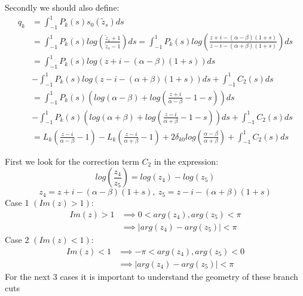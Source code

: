 \documentclass{article}
\begin{document}
Secondly we should also define:
\begin{align}
    q_k&=\int_{-1}^1P_k(s)s_0(\tilde{z}_s)ds\\
    &=\int_{-1}^1P_k(s)log(\frac{\tilde{z}_s+1}{\tilde{z}_s-1})ds
    =\int_{-1}^1P_k(s)log(\frac{z+i-(\alpha-\beta)(1+s)}{z-i-(\alpha+\beta)(1+s)})ds\\
    &=\int_{-1}^1P_k(s)log(z+i-(\alpha-\beta)(1+s))ds\\
    &-\int_{-1}^1P_k(s)log(z-i-(\alpha+\beta)(1+s))ds+\int_{-1}^1C_2(s)ds\\
    &=\int_{-1}^1P_k(s)(log(\alpha-\beta)+log(\frac{z+i}{\alpha-\beta}-1-s))ds\\
    &-\int_{-1}^1P_k(s)(log(\alpha+\beta)+log(\frac{z-i}{\alpha+\beta}-1-s))ds+\int_{-1}^1C_2(s)ds\\
    &=L_k(\frac{z-i}{\alpha-\beta}-1)-L_k(\frac{z-i}{\alpha+\beta}-1)
    +2\delta_{k0}log(\frac{\alpha-\beta}{\alpha+\beta})+\int_{-1}^1C_2(s)ds
\end{align}

First we look for the correction term $C_2$ in the expression:
$$log(\frac{z_4}{z_5})=log(z_4)-log(z_5)$$
$$z_4=z+i-(\alpha-\beta)(1+s),\:z_5=z-i-(\alpha+\beta)(1+s)$$
Case 1 $(Im(z)>1)$:
\begin{align}
    Im(z)>1 &\implies 0<arg(z_4),arg(z_5)<\pi\\
    &\implies |arg(z_4)-arg(z_5)|<\pi
\end{align}
Case 2 $(Im(z)<1)$:
\begin{align}
    Im(z)<1 &\implies -\pi<arg(z_4),arg(z_5)<0\\
    &\implies |arg(z_4)-arg(z_5)|<\pi
\end{align}
For the next 3 cases it is important to understand the geometry of these branch cuts
\end{document}
